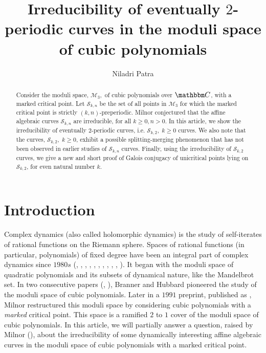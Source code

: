 \documentclass[reqno]{amsart}
\title[irreducibility of eventually $2$-periodic curves]{Irreducibility of eventually $2$-periodic curves in the moduli space of cubic polynomials}
\author{Niladri Patra}
\numberwithin{equation}{section}
\theoremstyle{plain}
\theoremstyle{definition}
\theoremstyle{definition}
\newcommand{\C}{{\mathbbm C}}
\begin{document}
\maketitle

\begin{abstract}
    Consider the moduli space, $\mathcal{M}_{3},$ of cubic polynomials over $\C$, with a marked critical point. Let $\mathscr{S}_{k,n}$ be the set of all points in $\mathcal{M}_{3}$ for which the marked critical point is strictly $(k,n)$-preperiodic. Milnor conjectured that the affine algebraic curves $\mathscr{S}_{k,n}$ are irreducible, for all $k \geq 0, n>0$. In this article, we show the irreducibility of eventually $2$-periodic curves, i.e. $\mathscr{S}_{k,2},\; k\geq 0$ curves. We also note that the curves, $\mathscr{S}_{k,2},\; k\geq 0$, exhibit a possible splitting-merging phenomenon that has not been observed in earlier studies of $\mathscr{S}_{k,n}$ curves. Finally, using the irreducibility of $\mathscr{S}_{k,2}$ curves, we give a new and short proof of Galois conjugacy of unicritical points lying on $\mathscr{S}_{k,2}$, for even natural number $k$.   
\end{abstract}

\section{Introduction}
    Complex dynamics (also called holomorphic dynamics) is the study of self-iterates of rational functions on the Riemann sphere. Spaces of rational functions (in particular, polynomials) of fixed degree have been an integral part of complex dynamics since $1980s$ (\cite{BM81}, \cite{BH88}, \cite{M90}, \cite{BDK91}, \cite{BH92}, \cite{MP92}, \cite{R06}, \cite{LQ07}, \cite{inbook}, \cite{BKM10}, \cite{Milnor+2014+15+24}). It began with the moduli space of quadratic polynomials and its subsets of dynamical nature, like the Mandelbrot set. In two consecutive papers (\cite{BH88}, \cite{BH92}), Branner and Hubbard pioneered the study of the moduli space of cubic polynomials. Later in a $1991$ preprint, published as \cite{inbook}, Milnor restructured this moduli space by considering cubic polynomials with a \emph{marked} critical point. This space is a ramified $2$ to $1$ cover of the moduli space of cubic polynomials. In this article, we will partially answer a question, raised by Milnor (\cite{inbook}), about the irreducibility of some dynamically interesting affine algebraic curves in the moduli space of cubic polynomials with a marked critical point.
    
\end{document}
